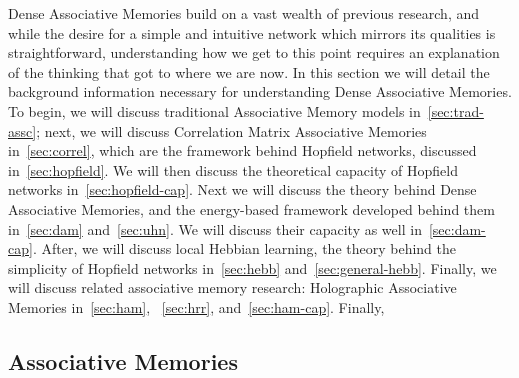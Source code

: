 \documentclass{article}
\theoremstyle{definition}
\begin{document}
Dense Associative Memories build on a vast wealth of previous research, and
while the desire for a simple and intuitive network which mirrors its qualities
is straightforward, understanding how we get to this point requires
an explanation of the thinking that got to where we are now. In this section
we will detail the background information necessary for understanding Dense
Associative Memories. To begin, we will discuss traditional Associative Memory
models in~\autoref{sec:trad-assc}; next, we will discuss Correlation Matrix
Associative Memories in~\autoref{sec:correl}, which are the framework behind
Hopfield networks, discussed in~\autoref{sec:hopfield}. We will then discuss
the theoretical capacity of Hopfield networks in~\autoref{sec:hopfield-cap}.
Next we will discuss the theory behind Dense Associative Memories, and the
energy-based framework developed behind them in~\autoref{sec:dam}
and~\autoref{sec:uhn}. We will discuss their capacity as well
in~\autoref{sec:dam-cap}. After, we will discuss local Hebbian learning,
the theory behind the simplicity of Hopfield networks in~\autoref{sec:hebb}
and~\autoref{sec:general-hebb}. Finally, we will discuss related associative
memory research: Holographic Associative Memories in~\autoref{sec:ham},~
\autoref{sec:hrr}, and~\autoref{sec:ham-cap}. Finally,

\subsection{Associative Memories}\label{sec:trad-assc}
\end{document}
